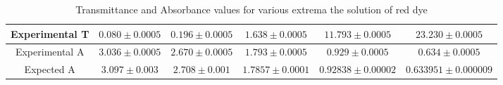 
\begin{table}
    \begin{adjustbox}{width=1.2\textwidth, center}
        \begin{tabular} {|c|c|c|c|c|c|}
            \hline
            Experimental T & $0.080 \pm 0.0005$ & $0.196 \pm 0.0005$ & $1.638 \pm 0.0005$  & $11.793 \pm 0.0005$   & $23.230 \pm 0.0005$     \\
            \hline
            Experimental A & $3.036 \pm 0.0005$ & $2.670 \pm 0.0005$ & $1.793 \pm 0.0005$  & $0.929 \pm 0.0005$    & $0.634 \pm 0.0005$      \\
            \hline
            Expected A     & $3.097 \pm 0.003$  & $2.708 \pm 0.001$  & $1.7857 \pm 0.0001$ & $0.92838 \pm 0.00002$ & $0.633951 \pm 0.000009$ \\
            \hline
        \end{tabular}
    \end{adjustbox}
    \caption{Transmittance and Absorbance values for various extrema the solution of red dye}
    \label{tab:red}
\end{table}